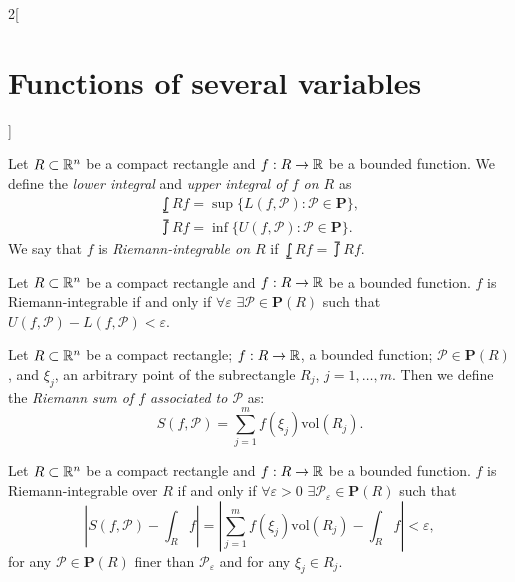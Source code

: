 \documentclass[../../../main.tex]{subfiles}
\begin{document}
\begin{multicols}{2}[\section{Functions of several variables}]
\begin{definition}
    \end{definition}
    \begin{definition}
        Let $R\subset\mathbb{R}^n$ be a compact rectangle and $f:R\rightarrow\mathbb{R} $ be a bounded function. We define the \textit{lower integral} and \textit{upper integral of $f$ on $R$} as
        \begin{gather*}
            \lowint{R}{}f=\sup\{L(f,\mathcal{P}):\mathcal{P}\in\textbf{P}\},\\
            \upint{R}{}f=\inf\{U(f,\mathcal{P}):\mathcal{P}\in\textbf{P}\}.
        \end{gather*} We say that $f$ is \textit{Riemann-integrable on $R$} if $\displaystyle\lowint{R}{}f=\upint{R}{}f$.
    \end{definition}
    \begin{prop}
        Let $R\subset\mathbb{R}^n$ be a compact rectangle and $f:R\rightarrow\mathbb{R} $ be a bounded function. $f$ is Riemann-integrable if and only if $\forall\varepsilon$ $\exists\mathcal{P}\in\textbf{P}(R)$ such that $U(f,\mathcal{P})-L(f,\mathcal{P})<\varepsilon$.
    \end{prop}
    \begin{definition}
        Let $R\subset\mathbb{R}^n$ be a compact rectangle; $f:R\rightarrow\mathbb{R} $, a bounded function; $\mathcal{P}\in\textbf{P}(R)$, and $\xi_j$, an arbitrary point of the subrectangle $R_j$, $j=1,\ldots,m$. Then we define the \textit{Riemann sum of $f$ associated to $\mathcal{P}$} as: $$S(f,\mathcal{P})=\sum_{j=1}^mf(\xi_j)\text{vol}(R_j).$$
    \end{definition}
    \begin{theorem}
        Let $R\subset\mathbb{R}^n$ be a compact rectangle and $f:R\rightarrow\mathbb{R} $ be a bounded function. $f$ is Riemann-integrable over $R$ if and only if $\forall\varepsilon>0$ $\exists\mathcal{P}_\varepsilon\in\textbf{P}(R)$ such that $$\left|S(f,\mathcal{P})-\int_Rf\right|=\left|\sum_{j=1}^mf(\xi_j)\text{vol}(R_j)-\int_Rf\right|<\varepsilon,$$ for any $\mathcal{P}\in\textbf{P}(R)$ finer than $\mathcal{P}_\varepsilon$ and for any $\xi_j\in R_j$.
    \end{theorem}

\end{multicols}
\end{document}
